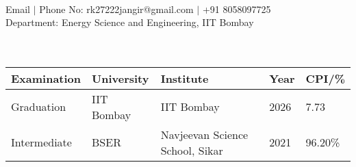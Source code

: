 \documentclass{article}
\begin{document}
\vspace*{-6cm}
\\  Email $\vert$ Phone No: rk27222jangir@gmail.com $\vert$ +91 8058097725\\     Department: Energy Science and Engineering, IIT Bombay            \\

\noindent {}\\[\lsep] \\
\begin{tabular}{ l @{\hskip 0.75in} l @{\hskip 0.75in} l @{\hskip 0.5in} l @{\hskip 0.25in} l }
\hline
\textbf{Examination} & \textbf{University} & \textbf{Institute} & \textbf{Year} & \textbf{CPI/\%} \\[0.025cm]

\hline
Graduation & IIT Bombay & IIT Bombay & 2026 & 7.73\\


Intermediate & BSER & Navjeevan Science School, Sikar & 2021 & 96.20\%\\
\hline
\end{tabular}
\\[0.05cm]
\begin{table}
    \begin{minipage}{0.15\linewidth}
        \centering
    \end{minipage}
    \begin{minipage}{0.65\linewidth}
        \setlength{\tabcolsep}{70pt}
        \def\arraystretch{1.15}
        \begin{tabular}{ll}
        \end{tabular}
    \end{minipage}\hfill
\end{table} 

\vspace{-2.5pt}
\end{document}
